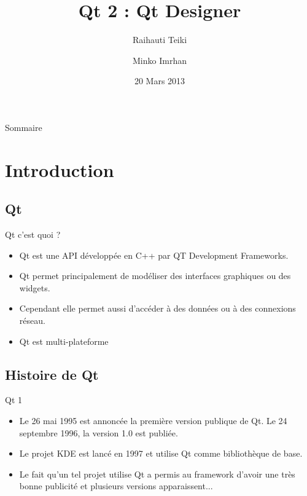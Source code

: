\documentclass{beamer}
\title{Qt 2 : Qt Designer}
\author{Raihauti Teiki \and Minko Imrhan}
\institute[Université de Montpellier]
\date{20 Mars 2013}
\begin{document}
\begin{frame}
  \titlepage
\end{frame}

\begin{frame}{Sommaire}
  \tableofcontents
\end{frame}


\section{Introduction}

\subsection{Qt}

\begin{frame}{Qt c'est quoi ?}
  \begin{itemize}
    \item {
        Qt est une API développée en C++ par QT Development Frameworks.
    \pause
    }
    \item {
        Qt permet principalement de modéliser des interfaces graphiques ou des widgets.
    \pause
    }
    \item {
        Cependant elle permet aussi d'accéder à des données ou à des connexions réseau.
    \pause
    }
    \item {
        Qt est multi-plateforme
    }
    \end{itemize}
\end{frame}


\subsection{Histoire de Qt}

\begin{frame}{Qt 1}
  \begin{itemize}
    \item {
        Le 26 mai 1995 est annoncée la première version publique de Qt. Le 24 septembre 1996, la version 1.0 est publiée.
    \pause
    }
    \item {
        Le projet KDE est lancé en 1997 et utilise Qt comme bibliothèque de base.
    \pause
    }
    \item {
        Le fait qu'un tel projet utilise Qt a permis au framework d'avoir une très bonne publicité et plusieurs versions apparaissent...
    }
    \end{itemize}
\end{frame}
\end{document}
